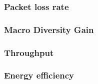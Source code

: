 \subsubsection{Packet loss rate}
\subsubsection{Macro Diversity Gain}
\subsubsection{Throughput}
\subsubsection{Energy efficiency}

















